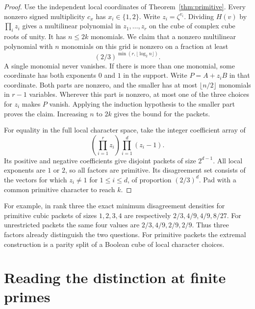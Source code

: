 \documentclass[11pt,letterpaper]{article}
\theoremstyle{remark}
\begin{document}
\begin{proof}
Use the independent local coordinates of Theorem~\ref{thm:primitive}.
Every nonzero signed multiplicity $c_x$ has $x_i\in\{1,2\}$.
Write $z_i=\zeta^{v_i}$. Dividing $H(v)$ by $\prod_i z_i$ gives a
multilinear polynomial in $z_1,\ldots,z_r$ on the cube of complex
cube roots of unity. It has $n\le2k$ monomials. We claim that a nonzero
multilinear polynomial with $n$ monomials on this grid is nonzero on a
fraction at least
\[
             (2/3)^{\min(r,\lfloor\log_2 n\rfloor)} .
\]
A single monomial never vanishes. If there is more than one monomial,
some coordinate has both exponents $0$ and $1$ in the support.
Write $P=A+z_i B$ in that coordinate. Both parts are nonzero, and
the smaller has at most $\lfloor n/2\rfloor$ monomials in $r-1$
variables. Wherever this part is nonzero, at most one of the three
choices for $z_i$ makes $P$ vanish. Applying the induction hypothesis
to the smaller part proves the claim. Increasing $n$ to $2k$ gives
the bound for the packets.

For equality in the full local character space, take the integer
coefficient array of
\[
    \left(\prod_{i=1}^r z_i\right)\prod_{i=1}^d(z_i-1).
\]
Its positive and negative coefficients give disjoint packets of
size $2^{d-1}$. All local exponents are $1$ or $2$, so all factors
are primitive. Its disagreement set consists of the vectors for
which $z_i\ne1$ for $1\le i\le d$, of proportion $(2/3)^d$.
Pad with a common primitive character to reach $k$.
\end{proof}

For example, in rank three the exact minimum disagreement densities for
primitive cubic packets of sizes $1,2,3,4$ are respectively
$2/3,4/9,4/9,8/27$. For unrestricted packets the same four values
are $2/3,4/9,2/9,2/9$. Thus three factors already distinguish the
two questions. For primitive packets the extremal construction is a
parity split of a Boolean cube of local character choices.
\section{Reading the distinction at finite primes}\label{sec:primes}
\end{document}
